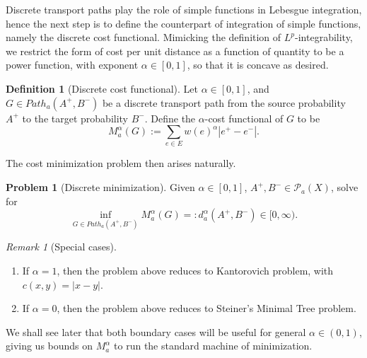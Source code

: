\documentclass[fleqn]{article}
\theoremstyle{definition}
\newtheorem{defn}[thm]{Definition}
\newtheorem{prob}[thm]{Problem}
\theoremstyle{remark}
\newtheorem{rem}[thm]{Remark}
\renewcommand{\P}{\mathcal{P}} %
\begin{document}
Discrete transport paths play the role of simple functions in Lebesgue integration, hence the next step is to define the counterpart of integration of simple functions, namely the discrete cost functional. Mimicking the definition of $L^p$-integrability, we restrict the form of cost per unit distance as a function of quantity to be a power function, with exponent $\alpha \in[0,1]$, so that it is concave as desired.

\begin{defn}[Discrete cost functional]
Let $\alpha \in[0,1]$, and $G\in Path_a(A^+,B^-)$ be a discrete transport path from the source probability $A^+$ to the target probability $B^-$. Define the $\alpha$-cost functional of $G$ to be
$$M_a^\alpha(G) := \sum_{e\in E} w(e)^\alpha |e^+ - e^-|.$$
\end{defn}

The cost minimization problem then arises naturally.
\begin{prob}[Discrete minimization]\label{prob:discrete}
Given $\alpha \in[0,1]$, $A^+, B^- \in \P_a(X)$, solve for
$$\inf_{G\in Path_a(A^+,B^-)} M_a^\alpha(G) =: d_a^\alpha(A^+,B^-) \in [0,\infty).$$
\end{prob}

\begin{rem}[Special cases]\label{rem:special}
\begin{enumerate}
	\item If $\alpha=1$, then the problem above reduces to Kantorovich problem, with $c(x,y)=|x-y|$.
	\item If $\alpha=0$, then the problem above reduces to Steiner's Minimal Tree problem.
\end{enumerate}
We shall see later that both boundary cases will be useful for general $\alpha\in(0,1)$, giving us bounds on $M_a^\alpha$ to run the standard machine of minimization.
\end{rem}
\end{document}
